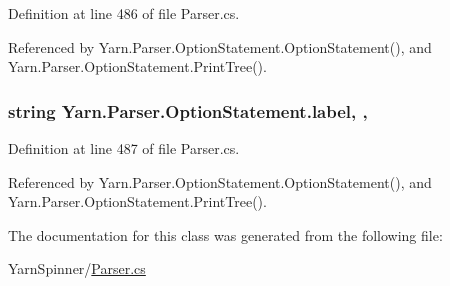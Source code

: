 Definition at line 486 of file Parser.\-cs.



Referenced by Yarn.\-Parser.\-Option\-Statement.\-Option\-Statement(), and Yarn.\-Parser.\-Option\-Statement.\-Print\-Tree().

\hypertarget{a00146_a7f27d78e67fed6992767e995e70fc468}{
\subsubsection[{label}]{\setlength{\rightskip}{0pt plus 5cm}string Yarn.\-Parser.\-Option\-Statement.\-label\hspace{0.3cm}{\ttfamily [get]}, {\ttfamily [set]}, {\ttfamily [package]}}}\label{a00146_a7f27d78e67fed6992767e995e70fc468}


Definition at line 487 of file Parser.\-cs.



Referenced by Yarn.\-Parser.\-Option\-Statement.\-Option\-Statement(), and Yarn.\-Parser.\-Option\-Statement.\-Print\-Tree().



The documentation for this class was generated from the following file\-:\begin{DoxyCompactItemize}
\item 
Yarn\-Spinner/\hyperlink{a00313}{Parser.\-cs}\end{DoxyCompactItemize}
